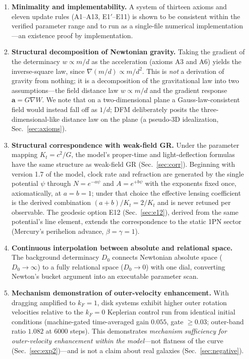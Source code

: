 \documentclass[aps,reprint,amsmath,amssymb,nofootinbib,superscriptaddress,floatfix]{revtex4-2}
\newcommand{\vect}[1]{\bm{#1}}
\newcommand{\Kt}{K_t}
\newcommand{\Dz}{D_0}
\begin{document}
\begin{enumerate}
\item[C1.]{\bf Minimality and implementability.}
A system of thirteen axioms and eleven update rules (A1--A13,
E1$'$--E11) is shown to be consistent within the verified parameter
range and to
run as a single-file numerical implementation---an existence proof by
implementation.

\item[C2.]{\bf Structural decomposition of Newtonian gravity.}
Taking the gradient of the determinacy $w \propto m/d$ as the
acceleration (axioms A3 and A6) yields the inverse-square law, since
$\nabla(m/d) \propto m/d^2$.
This is \emph{not} a derivation of gravity from nothing; it is a
decomposition of the gravitational law into two assumptions---the field
distance law $w \propto m/d$ and the gradient response
$\vect{a} = G\nabla W$.
We note that on a two-dimensional plane a Gauss-law-consistent field
would instead fall off as $1/d$; DFM deliberately posits the
three-dimensional-like distance law on the plane (a pseudo-3D
idealization, Sec.~\ref{sec:axioms}).

\item[C3.]{\bf Structural correspondence with weak-field GR.}
Under the parameter mapping $\Kt = c^2/G$, the model's proper-time and
light-deflection formulas have the same structure as weak-field GR
(Sec.~\ref{sec:corr}).
Beginning with version 1.7 of the model, clock rate and refraction are
generated
by the single potential $\psi$ through $N = e^{-a\psi}$ and
$A = e^{+b\psi}$ with the exponents fixed once, axiomatically, at
$a = b = 1$; under that choice the effective lensing coefficient is the
derived combination $(a+b)/\Kt = 2/\Kt$ and is never retuned per
observable.
The geodesic option E12 (Sec.~\ref{sec:e12}), derived from the same
potential's line element, extends the correspondence to the static 1PN
sector (Mercury's perihelion advance, $\beta = \gamma = 1$).

\item[C4.]{\bf Continuous interpolation between absolute and relational
space.}
The background determinacy $\Dz$ connects Newtonian absolute space
($\Dz \to \infty$) to a fully relational space ($\Dz \to 0$) with one
dial, converting Newton's bucket argument into an executable parameter
scan.

\item[C5.]{\bf Mechanism demonstration of outer-velocity enhancement.}
With dragging amplified to $k_F = 1$, disk systems exhibit higher
outer rotation velocities relative to the $k_F = 0$ Keplerian control
run from identical initial conditions (machine-gated time-averaged
gain $0.055$, gate $\ge 0.03$; outer-band ratio $1.082$ at 6000
steps).
This demonstrates \emph{mechanism sufficiency for outer-velocity
enhancement within the model}---not flatness of the curve
(Sec.~\ref{sec:exp2})---and is not a claim about real galaxies
(Sec.~\ref{sec:negative}).


\end{enumerate}
\end{document}
